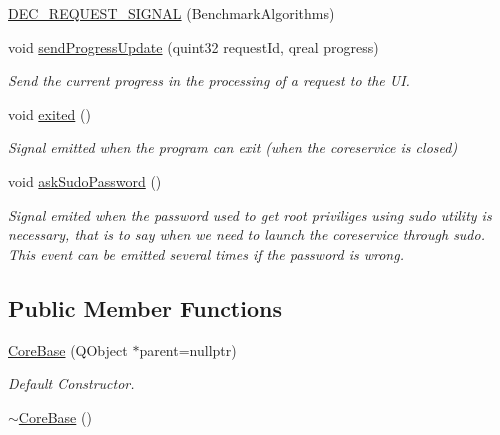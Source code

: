 \begin{DoxyCompactItemize}
\hyperlink{class_gost_crypt_1_1_core_1_1_core_base_a152ca4ed1db4b7a0e9319cb94d8ebe6b}{D\+E\+C\+\_\+\+R\+E\+Q\+U\+E\+S\+T\+\_\+\+S\+I\+G\+N\+AL} (Benchmark\+Algorithms)
\item 
void \hyperlink{class_gost_crypt_1_1_core_1_1_core_base_ad9ad2bcedfbbdaba41aec1767e4bf612}{send\+Progress\+Update} (quint32 request\+Id, qreal progress)
\begin{DoxyCompactList}\small\item\em Send the current progress in the processing of a request to the UI. \end{DoxyCompactList}\item 
void \hyperlink{class_gost_crypt_1_1_core_1_1_core_base_a92f0c8dd264e1fb1e9f638a6c279ce28}{exited} ()
\begin{DoxyCompactList}\small\item\em Signal emitted when the program can exit (when the coreservice is closed) \end{DoxyCompactList}\item 
void \hyperlink{class_gost_crypt_1_1_core_1_1_core_base_a695a59ae1ffd1417995061d9c3ec39cd}{ask\+Sudo\+Password} ()
\begin{DoxyCompactList}\small\item\em Signal emited when the password used to get root priviliges using sudo utility is necessary, that is to say when we need to launch the coreservice through sudo. This event can be emitted several times if the password is wrong. \end{DoxyCompactList}\end{DoxyCompactItemize}
\subsection*{Public Member Functions}
\begin{DoxyCompactItemize}
\item 
\hyperlink{class_gost_crypt_1_1_core_1_1_core_base_a288d2d68c5f004ce4d56dbece2bcf2ad}{Core\+Base} (Q\+Object $\ast$parent=nullptr)
\begin{DoxyCompactList}\small\item\em Default Constructor. \end{DoxyCompactList}\item 
\hyperlink{class_gost_crypt_1_1_core_1_1_core_base_a5dd8240d83bc37a01f91a9e9ef0eb005}{$\sim$\+Core\+Base} ()
\end{DoxyCompactItemize}
